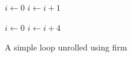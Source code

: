 \begin{figure}[H]
    \begin{minipage}[t]{0.5\textwidth}
        \centering
        \begin{algorithmic}
                \State $i \gets 0$
                    \State {}
                    \State $i \gets i + 1$
                \EndWhile
            \EndFunction
        \end{algorithmic}
    \end{minipage}
    \begin{minipage}[t]{0.5\textwidth}
        \centering
        \begin{algorithmic}
                \State $i \gets 0$
                    \State {}
                    \State {}
                    \State {}
                    \State {}
                    \State $i \gets i + 4$
                \EndWhile
            \EndFunction
        \end{algorithmic}
    \end{minipage}
    \caption{A simple loop unrolled using firm}
    \label{fig:basics:old-loop-unrolling}
\end{figure}